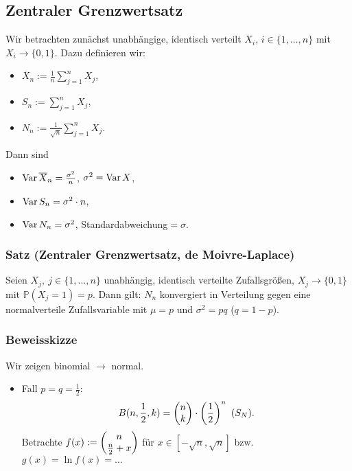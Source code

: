 \subsection{Zentraler Grenzwertsatz}
Wir betrachten zun\"achst unabh\"angige, identisch verteilt $X_i$, $i\in\{1,\ldots,n\}$ mit $X_i\to\{0,1\}$. Dazu definieren wir:
\begin{itemize}
\item $\overline{X}_n:=\frac{1}{n}\sum_{j=1}^nX_j$,
\item $S_n:=\sum_{j=1}^nX_j$,
\item $N_n:=\frac{1}{\sqrt{n}}\sum_{j=1}^nX_j$.
\end{itemize}
Dann sind
\begin{itemize}
\item $\operatorname{Var}\overline{X}_n=\frac{\sigma^2}{n}$, $\sigma^2=\operatorname{Var} X$,
\item $\operatorname{Var} S_n=\sigma^2\cdot n$,
\item $\operatorname{Var} N_n=\sigma^2$, Standardabweichung$=\sigma$.
\end{itemize}
\subsubsection{Satz (Zentraler Grenzwertsatz, de Moivre-Laplace)}
Seien $X_j,\ j\in\{1,\ldots,n\}$ unabh\"angig, identisch verteilte Zufallsgr\"o\ss{}en, $X_j\to\{0,1\}$ mit $\mathbb{P}(X_j=1)=p$. Dann gilt: $N_n$ konvergiert in Verteilung gegen eine normalverteile Zufallsvariable mit $\mu=p$ und $\sigma^2=pq$ ($q=1-p$).
\subsubsection{Beweisskizze}
Wir zeigen binomial $\to$ normal.
\begin{itemize}
\item Fall $p=q=\frac{1}{2}$:
\[
B(n,\frac{1}{2},k)=\neo{n\\k}\cdot\left(\frac{1}{2}\right)^n\ (S_N).
\]
Betrachte $f(x):=\begin{pmatrix}n\\\frac{n}{2}+x\end{pmatrix}$ f\"ur $x\in[-\sqrt{n},\sqrt{n}]$ bzw. $g(x)=\ln f(x)=\ldots$ \weg
\end{itemize}
